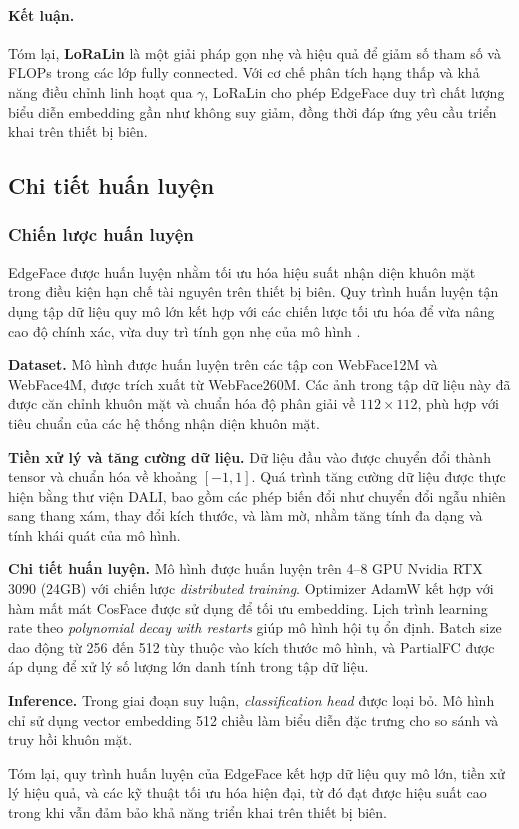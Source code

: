 \paragraph{Kết luận.} 
Tóm lại, \textbf{LoRaLin} là một giải pháp gọn nhẹ và hiệu quả để giảm số tham số và FLOPs trong các lớp fully connected. Với cơ chế phân tích hạng thấp và khả năng điều chỉnh linh hoạt qua $\gamma$, LoRaLin cho phép EdgeFace duy trì chất lượng biểu diễn embedding gần như không suy giảm, đồng thời đáp ứng yêu cầu triển khai trên thiết bị biên.

\subsection{Chi tiết huấn luyện}
\subsubsection{Chiến lược huấn luyện}

EdgeFace được huấn luyện nhằm tối ưu hóa hiệu suất nhận diện khuôn mặt trong điều kiện hạn chế tài nguyên trên thiết bị biên. 
Quy trình huấn luyện tận dụng tập dữ liệu quy mô lớn kết hợp với các chiến lược tối ưu hóa để vừa nâng cao độ chính xác, vừa duy trì tính gọn nhẹ của mô hình \cite{George2024}.

\textbf{Dataset.} Mô hình được huấn luyện trên các tập con WebFace12M và WebFace4M, được trích xuất từ WebFace260M. 
Các ảnh trong tập dữ liệu này đã được căn chỉnh khuôn mặt và chuẩn hóa độ phân giải về $112\times112$, phù hợp với tiêu chuẩn của các hệ thống nhận diện khuôn mặt.

\textbf{Tiền xử lý và tăng cường dữ liệu.} Dữ liệu đầu vào được chuyển đổi thành tensor và chuẩn hóa về khoảng $[-1,1]$. 
Quá trình tăng cường dữ liệu được thực hiện bằng thư viện DALI, bao gồm các phép biến đổi như chuyển đổi ngẫu nhiên sang thang xám, thay đổi kích thước, và làm mờ, nhằm tăng tính đa dạng và tính khái quát của mô hình.

\textbf{Chi tiết huấn luyện.} Mô hình được huấn luyện trên 4--8 GPU Nvidia RTX 3090 (24GB) với chiến lược \textit{distributed training}. 
Optimizer AdamW kết hợp với hàm mất mát CosFace được sử dụng để tối ưu embedding. 
Lịch trình learning rate theo \textit{polynomial decay with restarts} giúp mô hình hội tụ ổn định. 
Batch size dao động từ 256 đến 512 tùy thuộc vào kích thước mô hình, và PartialFC được áp dụng để xử lý số lượng lớn danh tính trong tập dữ liệu.

\textbf{Inference.} Trong giai đoạn suy luận, \textit{classification head} được loại bỏ. 
Mô hình chỉ sử dụng vector embedding 512 chiều làm biểu diễn đặc trưng cho so sánh và truy hồi khuôn mặt.

Tóm lại, quy trình huấn luyện của EdgeFace kết hợp dữ liệu quy mô lớn, tiền xử lý hiệu quả, và các kỹ thuật tối ưu hóa hiện đại, từ đó đạt được hiệu suất cao trong khi vẫn đảm bảo khả năng triển khai trên thiết bị biên.
